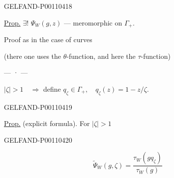 \begin{GelfandAdjacentEvidence}{GELFAND-P001104}{18}


\underline{Prop.} $\exists!$ $\Psi_W(g,z)$ — meromorphic on $\Gamma_+$.

Proof as in the case of curves

(there one uses the $\theta$-function, and here the $\tau$-function)

\begin{center}— · —\end{center}
$\lvert\zeta\rvert>1\quad\Rightarrow$ define
$q_\zeta\in\Gamma_+,\quad q_\zeta(z)=1-z/\zeta$.
\end{GelfandAdjacentEvidence}
\begin{GelfandAdjacentEvidence}{GELFAND-P001104}{19}


\underline{Prop.} (explicit formula). For $\lvert\zeta\rvert>1$
\end{GelfandAdjacentEvidence}
\begin{GelfandAdjacentEvidence}{GELFAND-P001104}{20}

\[
\widetilde{\Psi}_W(g,\zeta)=\frac{\tau_W(gq_\zeta)}{\tau_W(g)}
\]
\end{GelfandAdjacentEvidence}



